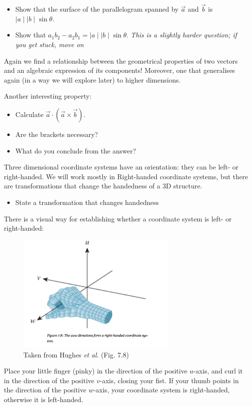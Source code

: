 \documentclass[a4wide]{article}
\begin{document}
\begin{itemize}
  \item Show that the surface of the parallelogram spanned by $\vec{a}$ and $\vec{b}$  is $\mid a \mid \mid b \mid \sin \theta$.
  \item Show that $a_1 b_2 - a_2b_1 = \mid a \mid \mid b \mid \sin \theta$. \emph{This is a slightly harder question; if you get stuck, move on}
\end{itemize}
Again we find a relationship between the geometrical properties of two vectors and an algebraic expression of its components! Moreover,
one that generalises again (in a way we will explore later) to higher dimensions.


Another interesting property:
\begin{itemize}
  \item Calculate $\vec{a} \cdot (\vec{a} \times \vec{b})$.
  \item Are the brackets necessary?
  \item What do you conclude from the answer?
\end{itemize}


Three dimensional coordinate systems have an orientation: they can be left- or right-handed. We will work mostly in Right-handed coordinate systems, but there
are transformations that change the handedness of a 3D structure.

\begin{itemize}
\item State a transformation that changes handedness
\end{itemize}

There is a visual way for establishing whether a coordinate system is left- or right-handed:

\begin{figure}[h]
  \begin{center}
    \includegraphics[width=0.7\textwidth]{handedness.png}
  \end{center}
   \caption{ Taken from Hughes \emph{et al.} (Fig. 7.8)}
\end{figure}
Place your little finger (pinky) in the direction of the positive $u$-axis, and curl it in the direction of the positive $v$-axis, closing your fist. If your
thumb points in the direction of the positive $w$-axis, your coordinate system is right-handed, otherwise it is left-handed.
\end{document}
